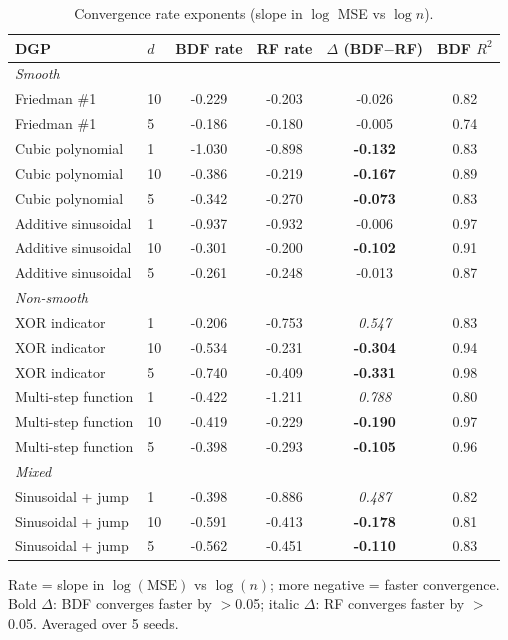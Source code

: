\begin{table}[htbp]
\centering
\caption{Convergence rate exponents (slope in $\log$ MSE vs $\log n$).}
\label{tab:convergence-rates}
\begin{tabular}{llcccc}
\toprule
DGP & $d$ & BDF rate & RF rate & $\Delta$ (BDF$-$RF) & BDF $R^2$ \\
\midrule
\multicolumn{6}{l}{\textit{Smooth}} \\
  Friedman \#1 & 10 & -0.229 & -0.203 & -0.026 & 0.82 \\
  Friedman \#1 & 5 & -0.186 & -0.180 & -0.005 & 0.74 \\
  Cubic polynomial & 1 & -1.030 & -0.898 & \textbf{-0.132} & 0.83 \\
  Cubic polynomial & 10 & -0.386 & -0.219 & \textbf{-0.167} & 0.89 \\
  Cubic polynomial & 5 & -0.342 & -0.270 & \textbf{-0.073} & 0.83 \\
  Additive sinusoidal & 1 & -0.937 & -0.932 & -0.006 & 0.97 \\
  Additive sinusoidal & 10 & -0.301 & -0.200 & \textbf{-0.102} & 0.91 \\
  Additive sinusoidal & 5 & -0.261 & -0.248 & -0.013 & 0.87 \\
\midrule
\multicolumn{6}{l}{\textit{Non-smooth}} \\
  XOR indicator & 1 & -0.206 & -0.753 & \textit{0.547} & 0.83 \\
  XOR indicator & 10 & -0.534 & -0.231 & \textbf{-0.304} & 0.94 \\
  XOR indicator & 5 & -0.740 & -0.409 & \textbf{-0.331} & 0.98 \\
  Multi-step function & 1 & -0.422 & -1.211 & \textit{0.788} & 0.80 \\
  Multi-step function & 10 & -0.419 & -0.229 & \textbf{-0.190} & 0.97 \\
  Multi-step function & 5 & -0.398 & -0.293 & \textbf{-0.105} & 0.96 \\
\midrule
\multicolumn{6}{l}{\textit{Mixed}} \\
  Sinusoidal + jump & 1 & -0.398 & -0.886 & \textit{0.487} & 0.82 \\
  Sinusoidal + jump & 10 & -0.591 & -0.413 & \textbf{-0.178} & 0.81 \\
  Sinusoidal + jump & 5 & -0.562 & -0.451 & \textbf{-0.110} & 0.83 \\
\bottomrule
\end{tabular}
\par\smallskip\footnotesize{Rate = slope in $\log(\text{MSE})$ vs $\log(n)$; more negative = faster convergence. Bold $\Delta$: BDF converges faster by $>$0.05; italic $\Delta$: RF converges faster by $>$0.05. Averaged over 5 seeds.}
\end{table}
